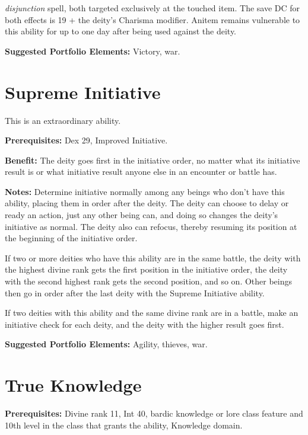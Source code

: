 \documentclass{article}
\begin{document}
\textit{disjunction }spell, both targeted exclusively at the touched item. The 
save DC for both effects is 19 + the deity's Charisma modifier. Anitem remains 
vulnerable to this ability for up to one day after being used against the deity.

\textbf{Suggested Portfolio Elements:} Victory, war.

\vspace{12pt}
\section*{Supreme Initiative}

This is an extraordinary ability.

\textbf{Prerequisites:} Dex 29, Improved Initiative.

\textbf{Benefit:} The deity goes first in the initiative order, no matter what 
its initiative result is or what initiative result anyone else in an encounter 
or battle has.

\textbf{Notes:} Determine initiative normally among any beings who don't have this 
ability, placing them in order after the deity. The deity can choose to delay or 
ready an action, just any other being can, and doing so changes the deity's initiative 
as normal. The deity also can refocus, thereby resuming its position at the beginning 
of the initiative order.

If two or more deities who have this ability are in the same battle, the deity 
with the highest divine rank gets the first position in the initiative order, the 
deity with the second highest rank gets the second position, and so on. Other beings 
then go in order after the last deity with the Supreme Initiative ability.

If two deities with this ability and the same divine rank are in a battle, make 
an initiative check for each deity, and the deity with the higher result goes first.

\textbf{Suggested Portfolio Elements:} Agility, thieves, war.

\vspace{12pt}
\section*{True Knowledge}

\textbf{Prerequisites:} Divine rank 11, Int 40, bardic knowledge or lore class 
feature and 10th level in the class that grants the ability, Knowledge domain.
\end{document}
